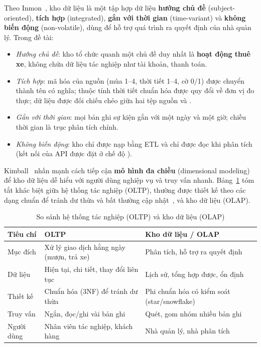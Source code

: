 \newpage
{}\label{sec:theory}

\label{sec:theory-dw}
Theo Inmon~\cite{inmon}, kho dữ liệu là một tập hợp dữ liệu \textbf{hướng chủ đề} (subject-oriented), \textbf{tích hợp} (integrated), \textbf{gắn với thời gian} (time-variant) và \textbf{không biến động} (non-volatile), dùng để hỗ trợ quá trình ra quyết định của nhà quản lý. Trong đề tài:
\begin{itemize}
    \item \textit{Hướng chủ đề}: kho tổ chức quanh một chủ đề duy nhất là \textbf{hoạt động thuê xe}, không chứa dữ liệu tác nghiệp như tài khoản, thanh toán.
    \item \textit{Tích hợp}: mã hóa của nguồn (mùa 1--4, thời tiết 1--4, cờ 0/1) được chuyển thành tên có nghĩa; thuộc tính thời tiết chuẩn hóa được quy đổi về đơn vị đo thực; dữ liệu được đối chiếu chéo giữa hai tệp nguồn  và .
    \item \textit{Gắn với thời gian}: mọi bản ghi sự kiện gắn với một ngày và một giờ; chiều thời gian là trục phân tích chính.
    \item \textit{Không biến động}: kho chỉ được nạp bằng ETL và chỉ được đọc khi phân tích (kết nối của API được đặt ở chế độ ).
\end{itemize}
Kimball~\cite{kimball} nhấn mạnh cách tiếp cận \textbf{mô hình đa chiều} (dimensional modeling) để kho dữ liệu dễ hiểu với người dùng nghiệp vụ và truy vấn nhanh. Bảng~\ref{tab:oltp-olap} tóm tắt khác biệt giữa hệ thống tác nghiệp (OLTP), thường được thiết kế theo các dạng chuẩn để tránh dư thừa và bất thường cập nhật~\cite{elmasri,quang}, và kho dữ liệu (OLAP).

\begin{table}[H]
\centering
\caption{So sánh hệ thống tác nghiệp (OLTP) và kho dữ liệu (OLAP)}
\label{tab:oltp-olap}
\begin{tabularx}{\textwidth}{|p{3.2cm}|X|X|}
\hline
\textbf{Tiêu chí} & \textbf{OLTP} & \textbf{Kho dữ liệu / OLAP} \\ \hline
Mục đích & Xử lý giao dịch hằng ngày (mượn, trả xe) & Phân tích, hỗ trợ ra quyết định \\ \hline
Dữ liệu & Hiện tại, chi tiết, thay đổi liên tục & Lịch sử, tổng hợp được, ổn định \\ \hline
Thiết kế & Chuẩn hóa (3NF) để tránh dư thừa & Phi chuẩn hóa có kiểm soát (star/snowflake) \\ \hline
Truy vấn & Ngắn, đọc/ghi vài bản ghi & Quét, gom nhóm nhiều bản ghi \\ \hline
Người dùng & Nhân viên tác nghiệp, khách hàng & Nhà quản lý, nhà phân tích \\ \hline
\end{tabularx}
\end{table}


